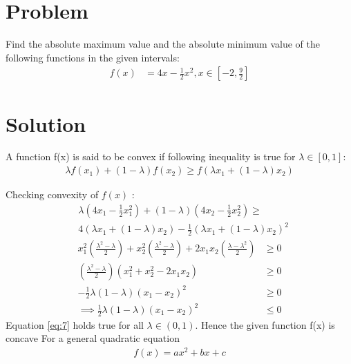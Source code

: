 \documentclass[10pt, a4paper]{article}
\title{\mytitle}
\author{\myauthor\hspace{1em}\\\contact\\FWC22034\hspace{6.5em}IITH\hspace{0.5em}\mymodule\hspace{6em}Assignment}
\providecommand{\sbrak}[1]{\ensuremath{{}\left[#1\right]}}
\providecommand{\brak}[1]{\ensuremath{\left(#1\right)}}
\begin{document}
	\maketitle
	\tableofcontents
   \section{Problem}
Find the absolute maximum value and the absolute minimum value of the following
functions in the given intervals:
\begin{align}
    f(x) &= 4x-\frac{1}{2}x^2 , x \in \sbrak{-2,\frac{9}{2}}
\end{align}
\section{Solution}
A function f(x) is said to be convex if following inequality is true for $\lambda \in [0,1] :$  \label{opt/2/1/a/lemma1}
\begin{align}
    \lambda f(x_1) + (1-\lambda)f(x_2) \geq f(\lambda x_1 + (1-\lambda)x_2)
    \label{eq:2}
\end{align}

Checking convexity of $f(x)$ :
\begin{equation}
\begin{aligned}
    &\lambda\brak{4x_1-\frac{1}{2}x_1^2} + (1-\lambda)\brak{4x_2-\frac{1}{2}x_2^2} \geq \\
    &4\brak{\lambda x_1 + (1-\lambda)x_2} - \frac{1}{2}\brak{\lambda x_1 + (1-\lambda)x_2}^2
\end{aligned}
\end{equation}
\begin{align}
        x_1^2\brak{\frac{\lambda^2-\lambda}{2}}+x_2^2\brak{\frac{\lambda^2-\lambda}{2}}+2x_1x_2\brak{\frac{\lambda-\lambda^2}{2}} &\geq 0 \\
        \brak{\frac{\lambda^2-\lambda}{2}}\brak{x_1^2+x_2^2-2x_1x_2} &\geq 0 \\
        -\frac{1}{2}\lambda\brak{1-\lambda}\brak{x_1-x_2}^2 &\geq 0 \\
        \implies \frac{1}{2}\lambda\brak{1-\lambda}\brak{x_1-x_2}^2 &\leq 0 \label{eq:7}
\end{align}
Equation \eqref{eq:7} holds true for all $\lambda\in(0,1)$. Hence the given function f(x) is concave
 For a general quadratic equation
\begin{align}
    f(x)=ax^2+bx+c
\end{align}
\end{document}
